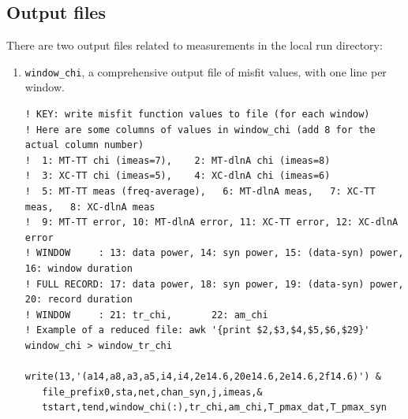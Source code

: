\documentclass[11pt,titlepage,fleqn]{article}
\begin{document}
\subsection{Output files}
There are two output files related to measurements in the local run directory:
%
\begin{enumerate}

\item \verb+window_chi+, a comprehensive output file of misfit values, with one line per window.
\begin{verbatim}
! KEY: write misfit function values to file (for each window)
! Here are some columns of values in window_chi (add 8 for the actual column number)
!  1: MT-TT chi (imeas=7),    2: MT-dlnA chi (imeas=8)
!  3: XC-TT chi (imeas=5),    4: XC-dlnA chi (imeas=6)
!  5: MT-TT meas (freq-average),   6: MT-dlnA meas,   7: XC-TT meas,   8: XC-dlnA meas
!  9: MT-TT error, 10: MT-dlnA error, 11: XC-TT error, 12: XC-dlnA error
! WINDOW     : 13: data power, 14: syn power, 15: (data-syn) power, 16: window duration
! FULL RECORD: 17: data power, 18: syn power, 19: (data-syn) power, 20: record duration
! WINDOW     : 21: tr_chi,       22: am_chi
! Example of a reduced file: awk '{print $2,$3,$4,$5,$6,$29}' window_chi > window_tr_chi

write(13,'(a14,a8,a3,a5,i4,i4,2e14.6,20e14.6,2e14.6,2f14.6)') &
   file_prefix0,sta,net,chan_syn,j,imeas,&
   tstart,tend,window_chi(:),tr_chi,am_chi,T_pmax_dat,T_pmax_syn


\end{verbatim}
\end{enumerate}
\end{document}
